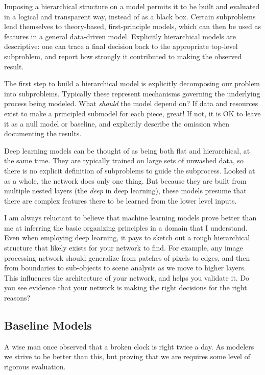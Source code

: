 \documentclass[10pt]{article}
\begin{document}
Imposing a hierarchical structure on a model permits it to be built and evaluated in a logical and transparent way, instead of as a black box. Certain subproblems lend themselves to theory-based, first-principle models, which can then be used as features in a general data-driven model. Explicitly hierarchical models are descriptive: one can trace a final decision back to the appropriate top-level subproblem, and report how strongly it contributed to making the observed result.

The first step to build a hierarchical model is explicitly decomposing our problem into subproblems. Typically these represent mechanisms governing the underlying process being modeled. What \textit{should} the model depend on? If data and resources exist to make a principled submodel for each piece, great! If not, it is OK to leave it as a null model or baseline, and explicitly describe the omission when documenting the results.

Deep learning models can be thought of as being both flat and hierarchical, at the same time. They are typically trained on large sets of unwashed data, so there is no explicit definition of subproblems to guide the subprocess. Looked at as a whole, the network does only one thing. But because they are built from multiple nested layers (the \textit{deep} in deep learning), these models presume that there are complex features there to be learned from the lower level inputs.

I am always reluctant to believe that machine learning models prove better than me at inferring the basic organizing principles in a domain that I understand. Even when employing deep learning, it pays to sketch out a rough hierarchical structure that likely exists for your network to find. For example, any image processing network should generalize from patches of pixels to edges, and then from boundaries to sub-objects to scene analysis as we move to higher layers. This influences the architecture of your network, and helps you validate it. Do you see evidence that your network is making the right decisions for the right reasons?

\subsection{Baseline Models}

A wise man once observed that a broken clock is right twice a day. As modelers we strive to be better than this, but proving that we are requires some level of rigorous evaluation.
\end{document}
